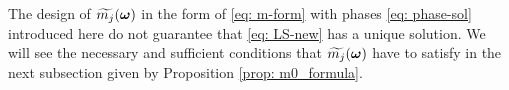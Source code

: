 The design of $\widetilde{m_{j}}(\boldsymbol{\omega})$ in the form of \eqref{eq: m-form} with phases \eqref{eq: phase-sol} introduced here do not guarantee that \eqref{eq: LS-new} has a unique solution. We will see the necessary and sufficient conditions that $\widetilde{m_{j}}(\boldsymbol{\omega})$ have to satisfy in the next subsection given by Proposition \ref{prop: m0_formula}.
\begin{comment}
where
\begin{align*}
(\V{\eta}_3-\V{\eta}_4)^\top(-\pi/2, \pi/2) &=-\pi/2\,(\text{mod}\,2\pi)\notag\\
 (\V{\eta}_6 - \V{\eta}_1)^\top(\pi/2,\pi/2) &= \pi/2\, (\text{mod}\,2\pi)\notag
\end{align*}
\end{comment}

